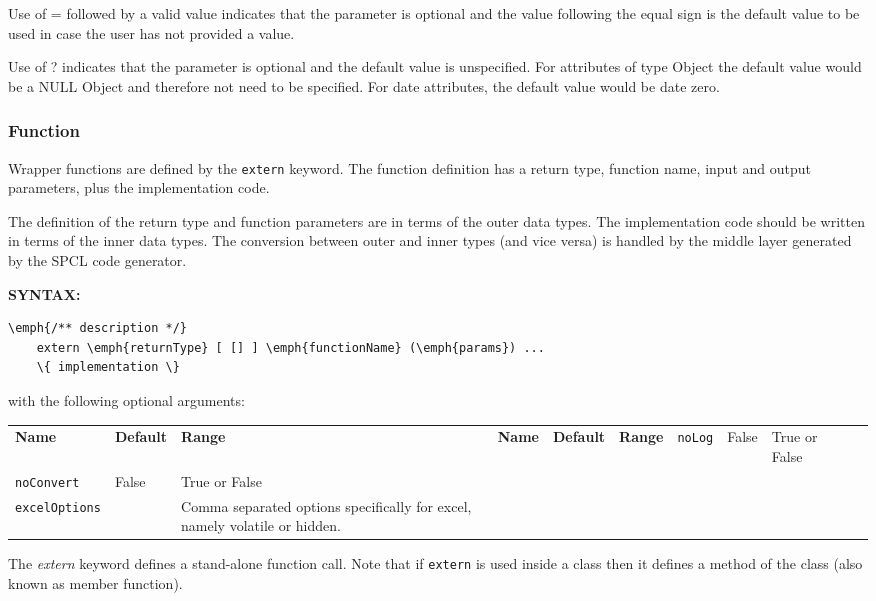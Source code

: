 Use of = followed by a valid value indicates that the parameter is optional and the value following the equal sign is the default value to be used in case the user has not provided a value.

Use of ? indicates that the parameter is optional and the default value is unspecified.
For attributes of type Object the default value would be a NULL Object and therefore not need to be specified.
For date attributes, the default value would be date zero.

\subsubsection{Function} \label{extern}

Wrapper functions are defined by the \texttt{extern} keyword. The function definition has a return type, function name, input and output parameters, plus the implementation code.

The definition of the return type and function parameters are in terms of the outer data types. The implementation code should be written in terms of the inner data types. The conversion between outer and inner types (and vice versa) is handled by the middle layer generated by the SPCL code generator.

\textbf{SYNTAX:}
\nopagebreak
\begin{Verbatim}[commandchars=\\\{\}]
    \emph{/** description */}
    extern \emph{returnType} [ [] ] \emph{functionName} (\emph{params}) ...
    \{ implementation \}
\end{Verbatim}
with the following optional arguments:


\small

\begin{longtable}{|p{80pt}|p{150pt}|p{140pt}|l}

 \textbf{Name} & \textbf{Default} & \textbf{Range} & 
\endfirsthead

 \textbf{Name} & \textbf{Default} & \textbf{Range} & 
\endhead

 
\endfoot

\endlastfoot

 \texttt{noLog} & False & True or False \\ 

 \texttt{noConvert} & False & True or False \\ 

 \texttt{excelOptions} &  & Comma separated options specifically for excel, namely volatile or hidden. \\ 

\end{longtable}
\normalsize
The \emph{extern} keyword defines a stand-alone function call.
Note that if \texttt{extern} is used inside a class then it defines a method of the class (also known as member function).

